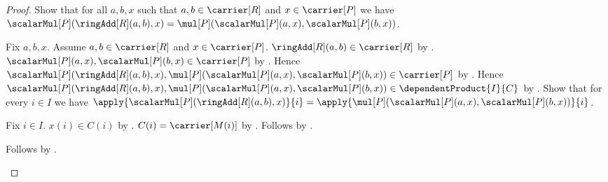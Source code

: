 \begin{proof}
    Show that for all $a,b,x$ such that $a,b\in\carrier[R]$ and
        $x\in\carrier[P]$ we have
        $\scalarMul[P](\ringAdd[R](a,b),x)
            =\mul[P](\scalarMul[P](a,x),\scalarMul[P](b,x))$.
    \begin{subproof}
        Fix $a,b,x$.
        Assume $a,b\in\carrier[R]$ and $x\in\carrier[P]$.
        $\ringAdd[R](a,b)\in\carrier[R]$ by .
        $\scalarMul[P](a,x),\scalarMul[P](b,x)\in\carrier[P]$ by
            .
        Hence
            $\scalarMul[P](\ringAdd[R](a,b),x),
                \mul[P](\scalarMul[P](a,x),\scalarMul[P](b,x))
            \in\carrier[P]$ by
            .
        Hence
            $\scalarMul[P](\ringAdd[R](a,b),x),
                \mul[P](\scalarMul[P](a,x),\scalarMul[P](b,x))
            \in\dependentProduct{I}{C}$ by .
        Show that for every $i\in I$ we have
            $\apply{\scalarMul[P](\ringAdd[R](a,b),x)}{i}
                =\apply{\mul[P]
                    (\scalarMul[P](a,x),\scalarMul[P](b,x))}{i}$.
        \begin{subproof}
            Fix $i\in I$.
            $x(i)\in C(i)$ by
                .
            $C(i)=\carrier[M(i)]$ by
                .
            Follows by
                .
        \end{subproof}
        Follows by .
    \end{subproof}


\end{proof}
